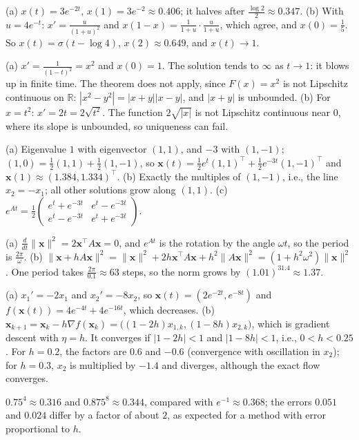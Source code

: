 \documentclass[11pt]{article}
\newcommand{\norm}[1]{\lVert #1 \rVert}
\begin{document}
\begin{description}[leftmargin=0pt, itemsep=0.3em]
    \item[\ref{pr:scalar-ode}.] (a) $x(t) = 3e^{-2t}$, $x(1) = 3e^{-2} \approx 0.406$; it halves after $\frac{\log 2}{2} \approx 0.347$. (b) With $u = 4e^{-t}$: $x' = \frac{u}{(1 + u)^2}$ and $x(1 - x) = \frac{1}{1 + u}\cdot\frac{u}{1 + u}$, which agree, and $x(0) = \frac{1}{5}$. So $x(t) = \sigma(t - \log 4)$, $x(2) \approx 0.649$, and $x(t) \to 1$.
    \item[\ref{pr:existence}.] (a) $x' = \frac{1}{(1 - t)^2} = x^2$ and $x(0) = 1$. The solution tends to $\infty$ as $t \to 1$: it blows up in finite time. The theorem does not apply, since $F(x) = x^2$ is not Lipschitz continuous on $\mathbb{R}$: $|x^2 - y^2| = |x + y||x - y|$, and $|x + y|$ is unbounded. (b) For $x = t^2$: $x' = 2t = 2\sqrt{t^2}$. The function $2\sqrt{|x|}$ is not Lipschitz continuous near $0$, where its slope is unbounded, so uniqueness can fail.
    \item[\ref{pr:linear-system}.] (a) Eigenvalue $1$ with eigenvector $(1, 1)$, and $-3$ with $(1, -1)$; $(1, 0) = \frac{1}{2}(1, 1) + \frac{1}{2}(1, -1)$, so $\mathbf{x}(t) = \frac{1}{2}e^t(1, 1)^\top + \frac{1}{2}e^{-3t}(1, -1)^\top$ and $\mathbf{x}(1) \approx (1.384, 1.334)^\top$. (b) Exactly the multiples of $(1, -1)$, i.e., the line $x_2 = -x_1$; all other solutions grow along $(1, 1)$. (c) $e^{At} = \frac{1}{2}\begin{pmatrix} e^t + e^{-3t} & e^t - e^{-3t} \\ e^t - e^{-3t} & e^t + e^{-3t} \end{pmatrix}$.
    \item[\ref{pr:rotation-ode}.] (a) $\frac{d}{dt}\norm{\mathbf{x}}^2 = 2\mathbf{x}^\top A\mathbf{x} = 0$, and $e^{At}$ is the rotation by the angle $\omega t$, so the period is $\frac{2\pi}{\omega}$. (b) $\norm{\mathbf{x} + hA\mathbf{x}}^2 = \norm{\mathbf{x}}^2 + 2h\mathbf{x}^\top A\mathbf{x} + h^2\norm{A\mathbf{x}}^2 = (1 + h^2\omega^2)\norm{\mathbf{x}}^2$. One period takes $\frac{2\pi}{0.1} \approx 63$ steps, so the norm grows by $(1.01)^{31.4} \approx 1.37$.
    \item[\ref{pr:gradient-flow}.] (a) $x_1' = -2x_1$ and $x_2' = -8x_2$, so $\mathbf{x}(t) = (2e^{-2t}, e^{-8t})$ and $f(\mathbf{x}(t)) = 4e^{-4t} + 4e^{-16t}$, which decreases. (b) $\mathbf{x}_{k+1} = \mathbf{x}_k - h\nabla f(\mathbf{x}_k) = \big((1 - 2h)x_{1,k}, (1 - 8h)x_{2,k}\big)$, which is gradient descent with $\eta = h$. It converges if $|1 - 2h| < 1$ and $|1 - 8h| < 1$, i.e., $0 < h < 0.25$. For $h = 0.2$, the factors are $0.6$ and $-0.6$ (convergence with oscillation in $x_2$); for $h = 0.3$, $x_2$ is multiplied by $-1.4$ and diverges, although the exact flow converges.
    \item[\ref{pr:euler-error}.] $0.75^4 \approx 0.316$ and $0.875^8 \approx 0.344$, compared with $e^{-1} \approx 0.368$; the errors $0.051$ and $0.024$ differ by a factor of about $2$, as expected for a method with error proportional to $h$.
\end{description}
\end{document}
